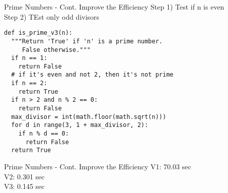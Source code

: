 \documentclass{beamer}
\begin{document}
\begin{frame}[fragile]{Prime Numbers - Cont. Improve the Efficiency}
\vspace{1em}
Step 1) Test if n is even\\
Step 2) TEst only odd divisors \vspace{-.5em}
\begin{verbatim}
def is_prime_v3(n):
  """Return 'True' if 'n' is a prime number.
     False otherwise."""
  if n == 1:
    return False
  # if it's even and not 2, then it's not prime
  if n == 2:
    return True
  if n > 2 and n % 2 == 0:
    return False
  max_divisor = int(math.floor(math.sqrt(n)))
  for d in range(3, 1 + max_divisor, 2):
    if n % d == 0:
      return False
  return True
\end{verbatim}
\end{frame}

\begin{frame}[fragile]{Prime Numbers - Cont. Improve the Efficiency}
V1: 70.03 sec\\
V2: 0.301 sec\\
V3: 0.145 sec\\
\end{frame}
\end{document}
